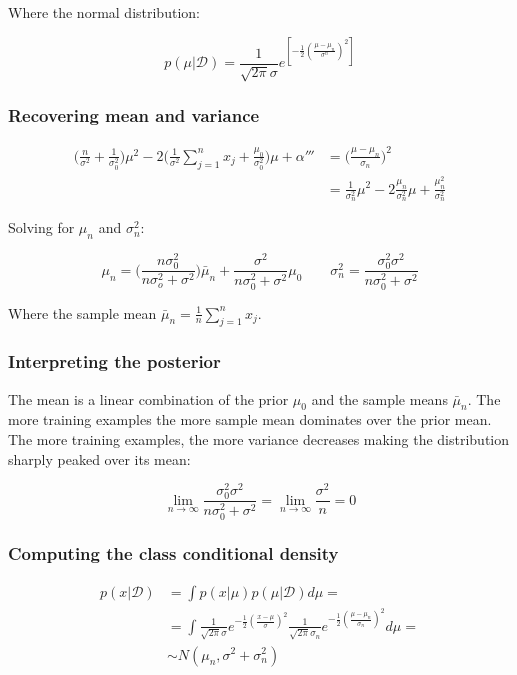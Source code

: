 		Where the normal distribution:

		$$p(\mu|\mathcal{D}) = \frac{1}{\sqrt{2\pi}\sigma}e^{[-\frac{1}{2}(\frac{\mu-\mu_n}{\sigma^n})^2]}$$

		\subsubsection{Recovering mean and variance}

		\begin{align*}
			\biggl(\frac{n}{\sigma^2} + \frac{1}{\sigma^2_0}\biggr)\mu^2 -2\biggl(\frac{1}{\sigma^2}\sum\limits_{j=1}^nx_j + \frac{\mu_0}{\sigma_0^2}\biggr)\mu + \alpha''' &=\biggl(\frac{\mu-\mu_n}{\sigma_n}\biggr)^2\\
																																																																																			&=\frac{1}{\sigma^2_n}\mu^2 - 2\frac{\mu_n}{\sigma^2_n}\mu + \frac{\mu_n^2}{\sigma^2_n}
		\end{align*}

		Solving for $\mu_n$ and $\sigma^2_n$:

		$$\mu_n = \biggl(\frac{n\sigma^2_0}{n\sigma^2_o+\sigma^2}\biggr)\bar{\mu}_n + \frac{\sigma^2}{n\sigma^2_0 + \sigma^2}\mu_0\qquad \sigma^2_n = \frac{\sigma^2_0\sigma^2}{n\sigma^2_0+\sigma^2}$$

		Where the sample mean $\bar{\mu}_n = \frac{1}{n}\sum\limits_{j=1}^n x_j$.

		\subsubsection{Interpreting the posterior}
		The mean is a linear combination of the prior $\mu_0$ and the sample means $\bar{\mu}_n$.
		The more training examples the more sample mean dominates over the prior mean.
		The more training examples, the more variance decreases making the distribution sharply peaked over its mean:

		$$\lim\limits_{n\rightarrow\infty}\frac{\sigma_0^2\sigma^2}{n\sigma^2_0+\sigma^2} = \lim\limits_{n\rightarrow\infty}\frac{\sigma^2}{n} = 0$$

		\subsubsection{Computing the class conditional density}

		\begin{align*}
			p(x|\mathcal{D}) &= \int p(x|\mu)p(\mu|\mathcal{D})d\mu=\\
											 &=\int\frac{1}{\sqrt{2\pi}\sigma}e^{-\frac{1}{2}(\frac{x-\mu}{\sigma})^2}\frac{1}{\sqrt{2\pi}\sigma_n}e^{-\frac{1}{2}(\frac{\mu-\mu_n}{\sigma_n})^2}d\mu=\\
											 &\sim N(\mu_n, \sigma^2 + \sigma^2_n)
		\end{align*}

